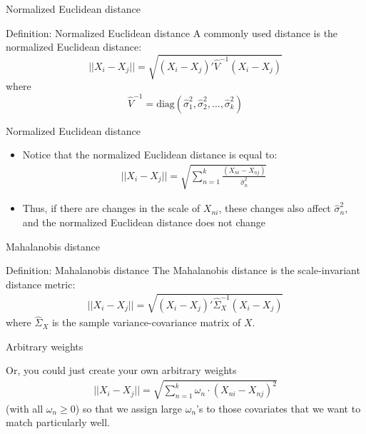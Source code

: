 \documentclass{beamer}
\begin{document}
\begin{frame}{Normalized Euclidean distance}

	\begin{block}{Definition: Normalized Euclidean distance}
	  A commonly used distance is the normalized Euclidean distance:$$||X_i-X_j|| = \sqrt{ (X_i-X_j)'\widehat{V}^{-1}(X_i - X_j) }$$ where
		$$\widehat{V}^{-1} = \text{diag}(\widehat{\sigma}_1^2, \widehat{\sigma}_2^2, \dots, \widehat{\sigma}_k^2)$$
	\end{block}
\end{frame}

\begin{frame}{Normalized Euclidean distance}
	\begin{itemize}
	\item Notice that the normalized Euclidean distance is equal to:
		\begin{eqnarray*}
		||X_i - X_j|| = \sqrt{\sum_{n=1}^k \frac{(X_{ni} - X_{nj})}{\widehat{\sigma}^2_n}}
		\end{eqnarray*}
	\item Thus, if there are changes in the scale of $X_{ni}$, these changes also affect $\widehat{\sigma}^2_n$, and the normalized Euclidean distance does not change
	\end{itemize}

\end{frame}


\begin{frame}{Mahalanobis distance}
	
	\begin{block}{Definition: Mahalanobis distance}
	The Mahalanobis distance is the scale-invariant distance metric:
		\begin{eqnarray*}
		||X_i-X_j|| = \sqrt{ (X_i-X_j)'\widehat{\Sigma}_X^{-1}(X_i - X_j) }
		\end{eqnarray*}
	where $\widehat{\Sigma}_X$ is the sample variance-covariance matrix of $X$.
	\end{block}


\end{frame}


\begin{frame}{Arbitrary weights}
	
	Or, you could just create your own arbitrary weights
		\begin{eqnarray*}
		||X_i-X_j|| = \sqrt{ \sum_{n=1}^k \omega_n \cdot (X_{ni} - X_{nj})^2}
		\end{eqnarray*}(with all $\omega_n\geq{0}$) so that we assign large $\omega_n$'s to those covariates that we want to match particularly well.

\end{frame}
\end{document}
